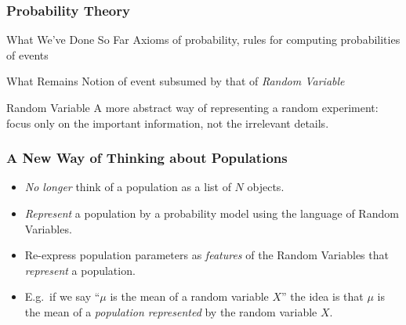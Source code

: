 \documentclass[handout]{beamer}
\date{Lecture \# 8}
\begin{document}
 


\begin{frame}[plain]
	\titlepage 
	

\end{frame} 

\begin{frame}
\frametitle{Probability Theory}


\begin{block}{What We've Done So Far}
Axioms of probability, rules for computing probabilities of events
\end{block}

\begin{block}{What Remains}
Notion of event subsumed by that of \emph{\alert{Random Variable}}
\end{block}
\begin{block}{Random Variable}
	A more abstract way of representing a random experiment: focus only on the important information, not the irrelevant details.
\end{block}


\end{frame}
\begin{frame}
\frametitle{A New Way of Thinking about Populations}

\begin{itemize}
	\item \emph{No longer} think of a population as a list of $N$ objects.
	\item \emph{Represent} a population by a \alert{probability model} using the language of Random Variables.
	\item Re-express population parameters as \emph{features} of the Random Variables that \emph{represent} a population.
	\item E.g.\ if we say ``$\mu$ is the mean of a random variable $X$'' the idea is that $\mu$ is the mean of a \alert{\emph{population represented}} by the random variable $X$.
\end{itemize}


\end{frame}
\end{document}
